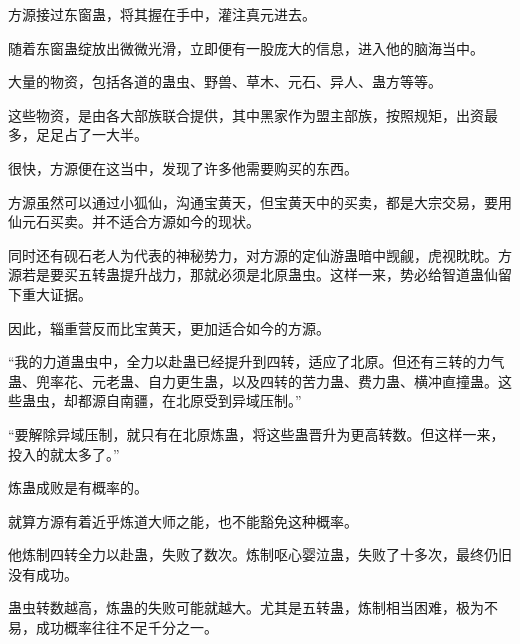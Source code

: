 \begin{this_body}
方源接过东窗蛊，将其握在手中，灌注真元进去。

随着东窗蛊绽放出微微光滑，立即便有一股庞大的信息，进入他的脑海当中。

大量的物资，包括各道的蛊虫、野兽、草木、元石、异人、蛊方等等。

这些物资，是由各大部族联合提供，其中黑家作为盟主部族，按照规矩，出资最多，足足占了一大半。

很快，方源便在这当中，发现了许多他需要购买的东西。

方源虽然可以通过小狐仙，沟通宝黄天，但宝黄天中的买卖，都是大宗交易，要用仙元石买卖。并不适合方源如今的现状。

同时还有砚石老人为代表的神秘势力，对方源的定仙游蛊暗中觊觎，虎视眈眈。方源若是要买五转蛊提升战力，那就必须是北原蛊虫。这样一来，势必给智道蛊仙留下重大证据。

因此，辎重营反而比宝黄天，更加适合如今的方源。

“我的力道蛊虫中，全力以赴蛊已经提升到四转，适应了北原。但还有三转的力气蛊、兜率花、元老蛊、自力更生蛊，以及四转的苦力蛊、费力蛊、横冲直撞蛊。这些蛊虫，却都源自南疆，在北原受到异域压制。”

“要解除异域压制，就只有在北原炼蛊，将这些蛊晋升为更高转数。但这样一来，投入的就太多了。”

炼蛊成败是有概率的。

就算方源有着近乎炼道大师之能，也不能豁免这种概率。

他炼制四转全力以赴蛊，失败了数次。炼制呕心婴泣蛊，失败了十多次，最终仍旧没有成功。

蛊虫转数越高，炼蛊的失败可能就越大。尤其是五转蛊，炼制相当困难，极为不易，成功概率往往不足千分之一。

\end{this_body}


